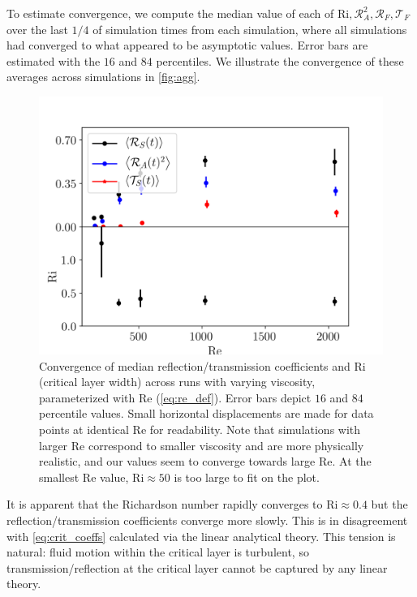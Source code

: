 \documentclass[
        fleqn,
        usenatbib,
    ]{mnras}
\begin{document}
To estimate convergence, we compute the median value of each of $\mathrm{Ri},
\mathcal{R}_A^2, \mathcal{R}_F, \mathcal{T}_F$ over the last $1/4$ of simulation
times from each simulation, where all simulations had converged to what appeared
to be asymptotic values. Error bars are estimated with the $16$ and $84$
percentiles. We illustrate the convergence of these averages across simulations
in \autoref{fig:agg}.
\begin{figure}
    \centering
    \includegraphics[width=\columnwidth]{plots/agg.png}
    \caption{Convergence of median reflection/transmission coefficients and
    $\mathrm{Ri}$ (critical layer width) across runs with varying viscosity,
    parameterized with $\mathrm{Re}$ (\autoref{eq:re_def}). Error bars depict
    $16$ and $84$ percentile values. Small horizontal displacements are made for
    data points at identical $\mathrm{Re}$ for readability. Note that
    simulations with larger $\mathrm{Re}$ correspond to smaller viscosity and
    are more physically realistic, and our values seem to converge towards large
    $\mathrm{Re}$. At the smallest $\mathrm{Re}$ value, $\mathrm{Ri} \approx 50$
    is too large to fit on the plot.}\label{fig:agg}
\end{figure}

It is apparent that the Richardson number rapidly converges to $\mathrm{Ri}
\approx 0.4$ but the reflection/transmission coefficients converge more slowly.
This is in disagreement with \autoref{eq:crit_coeffs} calculated via the linear
analytical theory. This tension is natural: fluid motion within the critical
layer is turbulent, so transmission/reflection at the critical layer cannot be
captured by any linear theory.
\end{document}
